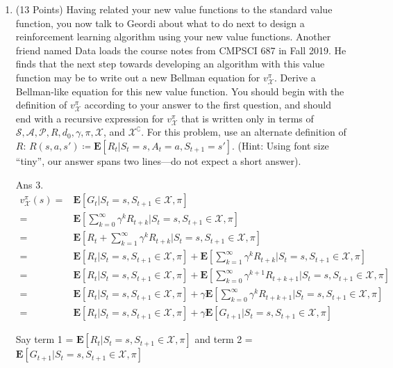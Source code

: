 \documentclass[]{article}
\begin{document}
\begin{enumerate}
    \item (13 Points) Having related your new value functions to the standard value function, you now talk to Geordi about what to do next to design a reinforcement learning algorithm using your new value functions. Another friend named Data loads the course notes from CMPSCI 687 in Fall 2019. He finds that the next step towards developing an algorithm with this value function may be to write out a new Bellman equation for $v^\pi_\mathcal X$. Derive a Bellman-like equation for this new value function. You should begin with the definition of $v^\pi_\mathcal X$ according to your answer to the first question, and should end with a recursive expression for $v^\pi_\mathcal X$ that is written only in terms of $\mathcal S, \mathcal A, \mathcal P,  R, d_0, \gamma, \pi, \mathcal X$, and $\mathcal X^\complement$. For this problem, use an alternate definition of $R$: $R(s,a,s')\coloneqq\mathbf{E}[R_t|S_t=s,A_t=a,S_{t+1}=s']$. (Hint: Using font size ``tiny'', our answer spans two lines---do not expect a short answer).

	{
		\color{blue}
			Ans 3.  \begin{align}
			        v^\pi_{\mathcal X}(s)=& \mathbf{E}[G_t | S_t = s, S_{t+1} \in \mathcal X, \pi] \\
				=& \mathbf{E}[ \sum_{k=0}^{\infty} \gamma^k R_{t+k} | S_t = s, S_{t+1} \in \mathcal X, \pi] \\
				=& \mathbf{E}[ R_t + \sum_{k=1}^{\infty} \gamma^k R_{t+k} | S_t = s, S_{t+1} \in \mathcal X, \pi] \\
				=& \mathbf{E}[ R_t | S_t = s, S_{t+1} \in \mathcal X, \pi] + \mathbf{E}[ \sum_{k=1}^{\infty} \gamma^k R_{t+k} | S_t = s, S_{t+1} \in \mathcal X, \pi] \\
				=& \mathbf{E}[ R_t | S_t = s, S_{t+1} \in \mathcal X, \pi] + \mathbf{E}[ \sum_{k=0}^{\infty} \gamma^{k+1} R_{t+k+1} | S_t = s, S_{t+1} \in \mathcal X, \pi] \\
				=& \mathbf{E}[ R_t | S_t = s, S_{t+1} \in \mathcal X, \pi] + \gamma \mathbf{E}[ \sum_{k=0}^{\infty} \gamma^{k} R_{t+k+1} | S_t = s, S_{t+1} \in \mathcal X, \pi] \\
				=& \mathbf{E}[ R_t | S_t = s, S_{t+1} \in \mathcal X, \pi] + \gamma \mathbf{E}[ G_{t+1} | S_t = s, S_{t+1} \in \mathcal X, \pi]
			    \end{align}

Say term 1 = $\mathbf{E}[ R_t | S_t = s, S_{t+1} \in \mathcal X, \pi]$ and term 2 = $\mathbf{E}[ G_{t+1} | S_t = s, S_{t+1} \in \mathcal X, \pi]$ \\

}
\end{enumerate}
\end{document}
